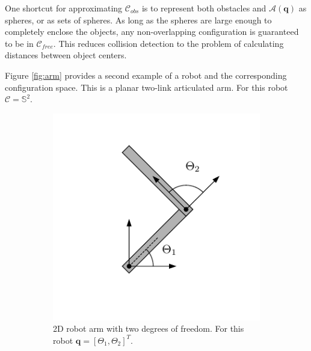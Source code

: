 One shortcut for approximating $\mathcal{C}_{obs}$ is to represent
both obstacles and $\mathcal{A}(\mathbf{q})$ as spheres, or as sets of
spheres.  As long as the spheres are large enough to completely
enclose the objects, any non-overlapping configuration is guaranteed
to be in $\mathcal{C}_{free}$. This reduces collision detection to the
problem of calculating distances between object centers.


Figure \ref{fig:arm} provides a second example of a robot and the
corresponding configuration space.  This is a planar two-link
articulated arm. For this robot $\mathcal{C} = \mathbb{S}^2$.


\begin{figure}
  \begin{center}  
    \begin{subfigure}[]{0.45\textwidth}
      \begin{center}
        \includegraphics[]{planning/figs/arm_cspace/arm_diagram.pdf}
      \end{center}
      \caption{2D robot arm with two degrees of freedom.  For this robot
        $\mathbf{q} = [\Theta_1, \Theta_2]^T$.}
    \end{subfigure} \hspace{1em}
    \begin{subfigure}[]{0.45\textwidth}
      \begin{center}  

\end{center}
\end{subfigure}
\end{center}
\end{figure}
